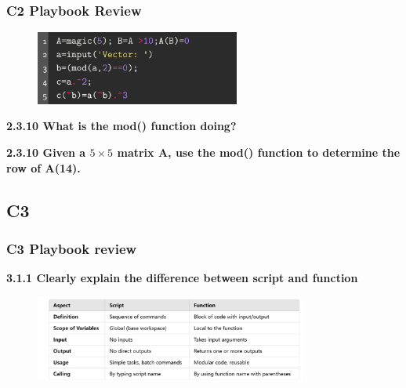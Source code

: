 \documentclass[
	11pt, %
]{beamer}
\begin{document}

\begin{frame}
    \frametitle{C2 Playbook Review}

    \begin{figure}
        \centering
        \includegraphics[width=0.6\textwidth]{c2_26.png}
    \end{figure}

    \textbf{2.3.10 What is the mod() function doing?}

    \textbf{2.3.10 Given a $5\times5$ matrix A, use the mod() function to determine the row of A(14).}

   
    
\end{frame}


\subsection{C3}
\begin{frame}
	\frametitle{C3 Playbook review}
    \textbf{3.1.1 Clearly explain the difference between script and function}
    \begin{figure}
        \centering
        \includegraphics[width= 0.8\textwidth]{script_function.png}
    \end{figure}
\end{frame}


\end{document}
